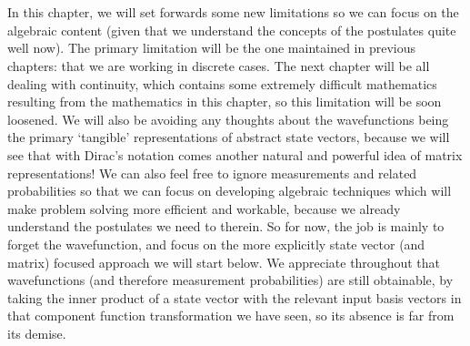 \\\\
In this chapter, we will set forwards some new limitations so we can focus on the algebraic content (given that we understand the concepts of the postulates quite well now). The primary limitation will be the one maintained in previous chapters: that we are working in discrete cases. The next chapter will be all dealing with continuity, which contains some extremely difficult mathematics resulting from the mathematics in this chapter, so this limitation will be soon loosened. We will also be avoiding any thoughts about the wavefunctions being the primary `tangible' representations of abstract state vectors, because we will see that with Dirac's notation comes another natural and powerful idea of matrix representations! We can also feel free to ignore measurements and related probabilities so that we can focus on developing algebraic techniques which will make problem solving more efficient and workable, because we already understand the postulates we need to therein. So for now, the job is mainly to forget the wavefunction, and focus on the more explicitly state vector (and matrix) focused approach we will start below. We appreciate throughout that wavefunctions (and therefore measurement probabilities) are still obtainable, by taking the inner product of a state vector with the relevant input basis vectors in that component function transformation we have seen, so its absence is far from its demise.
